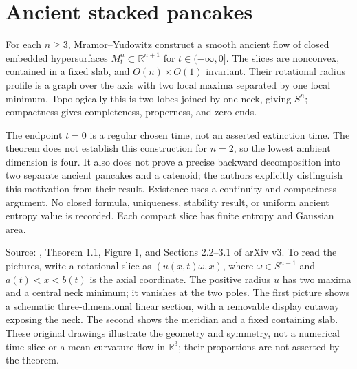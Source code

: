 \chapter{Ancient stacked pancakes}\label{sec:catalogue-stacked-pancakes}
\begin{example}\label{ex:catalogue-stacked-pancakes}
For each $n\geq3$, Mramor--Yudowitz construct a smooth ancient flow of closed embedded hypersurfaces $M_t^n\subset\mathbb R^{n+1}$ for $t\in(-\infty,0]$. The slices are nonconvex, contained in a fixed slab, and $O(n)\times O(1)$ invariant. Their rotational radius profile is a graph over the axis with two local maxima separated by one local minimum. Topologically this is two lobes joined by one neck, giving $S^n$; compactness gives completeness, properness, and zero ends.

The endpoint $t=0$ is a regular chosen time, not an asserted extinction time. The theorem does not establish this construction for $n=2$, so the lowest ambient dimension is four. It also does not prove a precise backward decomposition into two separate ancient pancakes and a catenoid; the authors explicitly distinguish this motivation from their result. Existence uses a continuity and compactness argument. No closed formula, uniqueness, stability result, or uniform ancient entropy value is recorded. Each compact slice has finite entropy and Gaussian area.

Source: \cite{CatMY26}, Theorem 1.1, Figure 1, and Sections 2.2--3.1 of arXiv v3. To read the pictures, write a rotational slice as $(u(x,t)\omega,x)$, where $\omega\in S^{n-1}$ and $a(t)<x<b(t)$ is the axial coordinate. The positive radius $u$ has two maxima and a central neck minimum; it vanishes at the two poles. The first picture shows a schematic three-dimensional linear section, with a removable display cutaway exposing the neck. The second shows the meridian and a fixed containing slab. These original drawings illustrate the geometry and symmetry, not a numerical time slice or a mean curvature flow in $\mathbb R^3$; their proportions are not asserted by the theorem.
\end{example}

